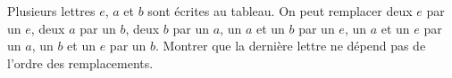 Plusieurs lettres $e$, $a$ et $b$ sont écrites au tableau. On peut remplacer deux $e$ par un $e$, deux $a$ par un $b$, deux $b$ par un $a$, un $a$ et un $b$ par un $e$, un $a$ et un $e$ par un $a$, un $b$ et un $e$ par un $b$. Montrer que la dernière lettre ne dépend pas de l'ordre des remplacements.
